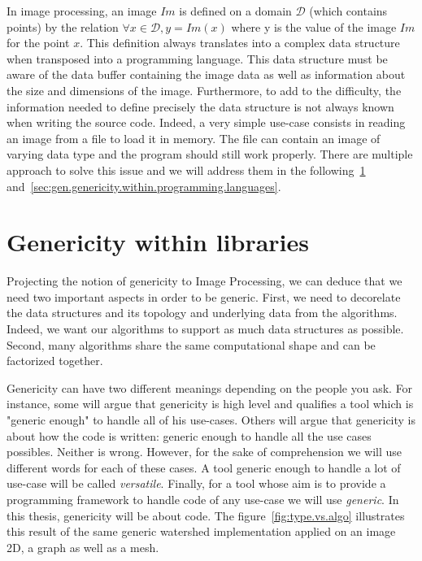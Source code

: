 In image processing, an image $Im$ is defined on a domain $\mathcal{D}$ (which contains points) by the relation $\forall
  x \in \mathcal{D}, y = Im(x)$ where y is the value of the image $Im$ for the point $x$. This definition always
translates into a complex data structure when transposed into a programming language. This data structure must be aware
of the data buffer containing the image data as well as information about the size and dimensions of the image.
Furthermore, to add to the difficulty, the information needed to define precisely the data structure is not always known
when writing the source code. Indeed, a very simple use-case consists in reading an image from a file to load it in
memory. The file can contain an image of varying data type and the program should still work properly. There are
multiple approach to solve this issue and we will address them in the following~\cref{sec:gen.within.libraries}
and~\cref{sec:gen.genericity.within.programming.languages}.



\section{Genericity within libraries}
\label{sec:gen.within.libraries}

Projecting the notion of genericity to Image Processing, we can deduce that we need two important aspects in order to be
generic. First, we need to decorelate the data structures and its topology and underlying data from the algorithms.
Indeed, we want our algorithms to support as much data structures as possible. Second, many algorithms share the same
computational shape and can be factorized together.

Genericity can have two different meanings depending on the people you ask. For instance, some will argue that
genericity is high level and qualifies a tool which is "generic enough" to handle all of his use-cases. Others will
argue that genericity is about how the code is written: generic enough to handle all the use cases possibles. Neither is
wrong. However, for the sake of comprehension we will use different words for each of these cases. A tool generic enough
to handle a lot of use-case will be called \emph{versatile}. Finally, for a tool whose aim is to provide a programming
framework to handle code of any use-case we will use \emph{generic}. In this thesis, genericity will be about code. The
figure~\ref{fig:type.vs.algo} illustrates this result of the same generic watershed implementation applied on an image
2D, a graph as well as a mesh.

